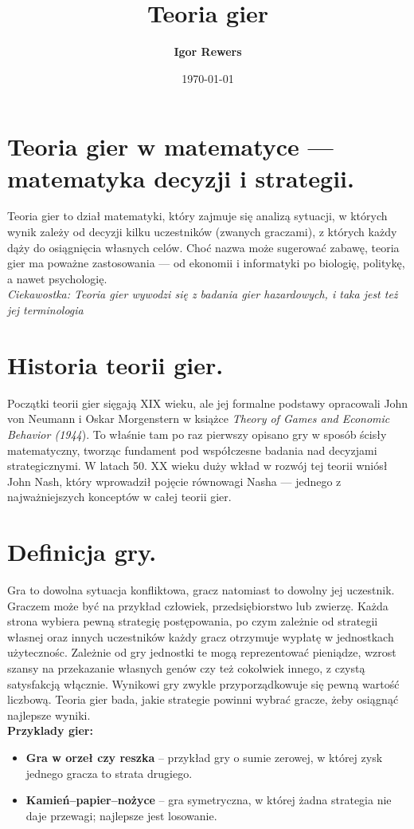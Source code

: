 \documentclass[12pt]{article}
\author{\textbf{Igor Rewers}}
\title{\textbf{Teoria gier}}
\date{\today}
\begin{document}
\maketitle

\section{Teoria gier w matematyce — matematyka decyzji i strategii.}
Teoria gier to dział matematyki, który zajmuje się analizą sytuacji, w których wynik zależy od decyzji kilku uczestników (zwanych graczami), z których każdy dąży do osiągnięcia własnych celów. Choć nazwa może sugerować zabawę, teoria gier ma poważne zastosowania — od ekonomii i informatyki po biologię, politykę, a nawet psychologię.
\\
\emph{Ciekawostka: Teoria gier wywodzi się z badania gier hazardowych, i taka jest też jej terminologia}

\section{Historia teorii gier.}
Początki teorii gier sięgają XIX wieku, ale jej formalne podstawy opracowali John von Neumann i Oskar Morgenstern w książce \emph{Theory of Games and Economic Behavior (1944}). To właśnie tam po raz pierwszy opisano gry w sposób ścisły matematyczny, tworząc fundament pod współczesne badania nad decyzjami strategicznymi.
W latach 50. XX wieku duży wkład w rozwój tej teorii wniósł John Nash, który wprowadził pojęcie równowagi Nasha — jednego z najważniejszych konceptów w całej teorii gier.

\section{Definicja gry.}
Gra to dowolna sytuacja konfliktowa, gracz natomiast to dowolny jej uczestnik. Graczem może być na przykład człowiek, przedsiębiorstwo lub zwierzę. Każda strona wybiera pewną strategię postępowania, po czym zależnie od strategii własnej oraz innych uczestników każdy gracz otrzymuje wypłatę w jednostkach użytecznośc. Zależnie od gry jednostki te mogą reprezentować pieniądze, wzrost szansy na przekazanie własnych genów czy też cokolwiek innego, z czystą satysfakcją włącznie. Wynikowi gry zwykle przyporządkowuje się pewną wartość liczbową. Teoria gier bada, jakie strategie powinni wybrać gracze, żeby osiągnąć najlepsze wyniki.
\\ \textbf{Przyklady gier:}
\begin{itemize}
\item \textbf{Gra w orzeł czy reszka} – przykład gry o sumie zerowej, w której zysk jednego gracza to strata drugiego.
\item \textbf{Kamień–papier–nożyce} – gra symetryczna, w której żadna strategia nie daje przewagi; najlepsze jest losowanie.
\end{itemize}
\end{document}
